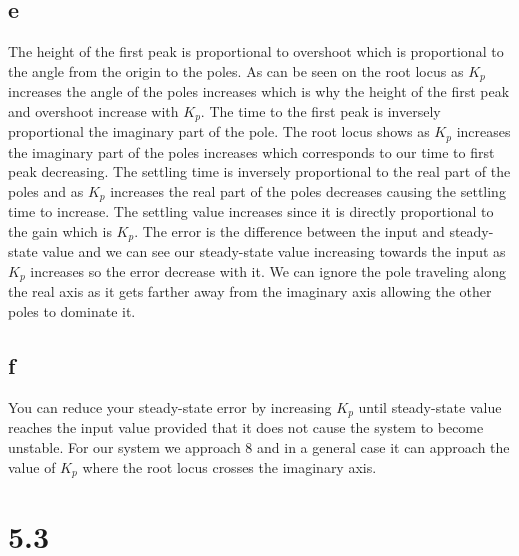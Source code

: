 \documentclass{article}
\begin{document}
\subsection*{e} %
The height of the first peak is proportional to overshoot which is proportional to the angle from the origin to the poles. As can be seen on the root locus as $K_p$ increases the angle of the poles increases which is why the height of the first peak and overshoot increase with $K_p$. The time to the first peak is inversely proportional the imaginary part of the pole. The root locus shows as $K_p$ increases the imaginary part of the poles increases which corresponds to our time to first peak decreasing. The settling time is inversely proportional to the real part of the poles and as $K_p$ increases the real part of the poles decreases causing the settling time to increase. The settling value increases since it is directly proportional to the gain which is $K_p$. The error is the difference between the input and steady-state value and we can see our steady-state value increasing towards the input as $K_p$ increases so the error decrease with it. We can ignore the pole traveling along the real axis as it gets farther away from the imaginary axis allowing the other poles to dominate it.

\subsection*{f} %
You can reduce your steady-state error by increasing $K_p$ until steady-state value reaches the input value provided that it does not cause the system to become unstable. For our system we approach 8 and in a general case it can approach the value of $K_p$ where the root locus crosses the imaginary axis.

\section*{5.3} %
\end{document}
